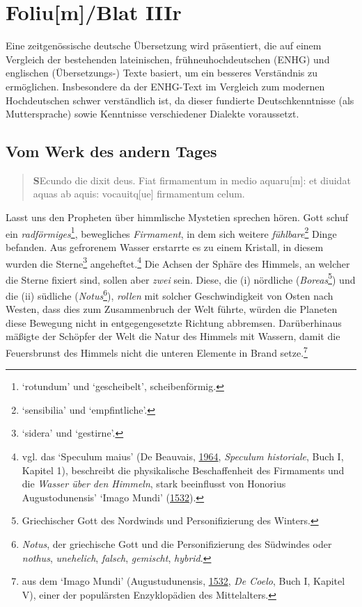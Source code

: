 \documentclass[
]{article}
\author{Dietmar Gerald Schrausser}
\date{09.05.2026}
\begin{document}
\hypertarget{foliumblat-iiir}{%
\section{Foliu{[}m{]}/Blat IIIr}\label{foliumblat-iiir}}

Eine zeitgenössische deutsche Übersetzung wird präsentiert, die auf
einem Vergleich der bestehenden lateinischen, frühneuhochdeutschen
(ENHG) und englischen (Übersetzungs-) Texte basiert, um ein besseres
Verständnis zu ermöglichen. Insbesondere da der ENHG-Text im Vergleich
zum modernen Hochdeutschen schwer verständlich ist, da dieser fundierte
Deutschkenntnisse (als Muttersprache) sowie Kenntnisse verschiedener
Dialekte voraussetzt.

\hypertarget{vom-werk-des-andern-tages}{%
\subsection{Vom Werk des andern Tages}\label{vom-werk-des-andern-tages}}

\begin{quote}
\textbf{S}Ecundo die dixit deus. Fiat firmamentum in medio
aquaru{[}m{]}: et diuidat aquas ab aquis: vocauitq{[}ue{]} firmamentum
celum.
\end{quote}

Lasst uns den Propheten über himmlische Mystetien sprechen hören. Gott
schuf ein \emph{radförmiges}\footnote{`rotundum' und `gescheibelt',
  scheibenförmig.}, bewegliches \emph{Firmament}, in dem sich weitere
\emph{fühlbare}\footnote{`sensibilia' und `empfintliche'.} Dinge
befanden. Aus gefrorenem Wasser erstarrte es zu einem Kristall, in
diesem wurden die Sterne\footnote{`sidera' und `gestirne'.}
angeheftet.\footnote{vgl. das `Speculum maius' (De Beauvais,
  \href{https://nbn-resolving.org/urn:nbn:de:hbz:061:1-20612}{1964},
  \emph{Speculum historiale}, Buch I, Kapitel 1), beschreibt die
  physikalische Beschaffenheit des Firmaments und die \emph{Wasser über
  den Himmeln}, stark beeinflusst von Honorius Augustodunensis' `Imago
  Mundi'
  (\href{https://archive.org/detail/DHonoriiAugustudunensisLibriSeptem/page/n6/mode/1up}{1532}).}
Die Achsen der Sphäre des Himmels, an welcher die Sterne fixiert sind,
sollen aber \emph{zwei} sein. Diese, die (i) nördliche
(\emph{Boreas}\footnote{Griechischer Gott des Nordwinds und
  Personifizierung des Winters.}) und die (ii) südliche
(\emph{Notus}\footnote{\emph{Notus}, der griechische Gott und die
  Personifizierung des Südwindes oder \emph{nothus}, \emph{unehelich},
  \emph{falsch}, \emph{gemischt}, \emph{hybrid}.}), \emph{rollen} mit
solcher Geschwindigkeit von Osten nach Westen, dass dies zum
Zusammenbruch der Welt führte, würden die Planeten diese Bewegung nicht
in entgegengesetzte Richtung abbremsen. Darüberhinaus mäßigte der
Schöpfer der Welt die Natur des Himmels mit Wassern, damit die
Feuersbrunst des Himmels nicht die unteren Elemente in Brand
setze.\footnote{aus dem `Imago Mundi' (Augustudunensis,
  \href{https://archive.org/detail/DHonoriiAugustudunensisLibriSeptem/page/n6/mode/1up}{1532},
  \emph{De Coelo}, Buch I, Kapitel V), einer der populärsten
  Enzyklopädien des Mittelalters.}
\end{document}

